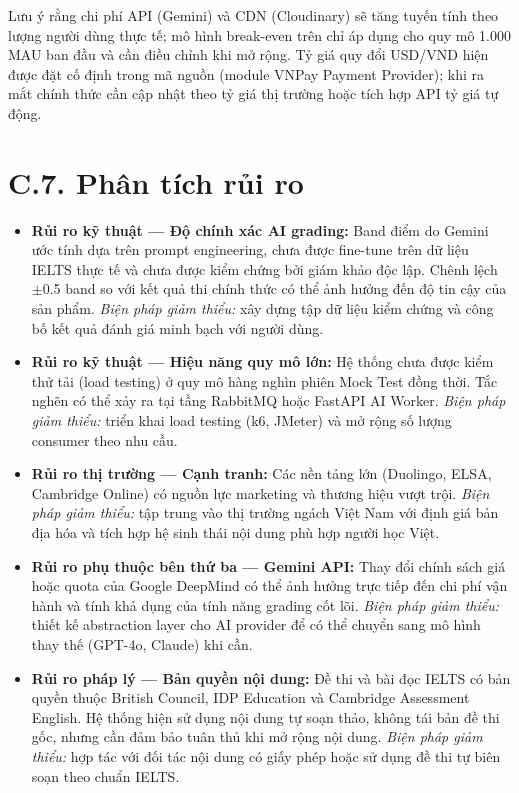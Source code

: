 Lưu ý rằng chi phí API (Gemini) và CDN (Cloudinary) sẽ tăng tuyến tính theo lượng người dùng thực tế; mô hình break-even trên chỉ áp dụng cho quy mô 1.000 MAU ban đầu và cần điều chỉnh khi mở rộng. Tỷ giá quy đổi USD/VND hiện được đặt cố định trong mã nguồn (module VNPay Payment Provider); khi ra mắt chính thức cần cập nhật theo tỷ giá thị trường hoặc tích hợp API tỷ giá tự động.

\section*{C.7. Phân tích rủi ro}

\begin{itemize}
    \item \textbf{Rủi ro kỹ thuật --- Độ chính xác AI grading:} Band điểm do Gemini ước tính dựa trên prompt engineering, chưa được fine-tune trên dữ liệu IELTS thực tế và chưa được kiểm chứng bởi giám khảo độc lập. Chênh lệch $\pm$0.5 band so với kết quả thi chính thức có thể ảnh hưởng đến độ tin cậy của sản phẩm. \textit{Biện pháp giảm thiểu:} xây dựng tập dữ liệu kiểm chứng và công bố kết quả đánh giá minh bạch với người dùng.

    \item \textbf{Rủi ro kỹ thuật --- Hiệu năng quy mô lớn:} Hệ thống chưa được kiểm thử tải (load testing) ở quy mô hàng nghìn phiên Mock Test đồng thời. Tắc nghẽn có thể xảy ra tại tầng RabbitMQ hoặc FastAPI AI Worker. \textit{Biện pháp giảm thiểu:} triển khai load testing (k6, JMeter) và mở rộng số lượng consumer theo nhu cầu.

    \item \textbf{Rủi ro thị trường --- Cạnh tranh:} Các nền tảng lớn (Duolingo, ELSA, Cambridge Online) có nguồn lực marketing và thương hiệu vượt trội. \textit{Biện pháp giảm thiểu:} tập trung vào thị trường ngách Việt Nam với định giá bản địa hóa và tích hợp hệ sinh thái nội dung phù hợp người học Việt.

    \item \textbf{Rủi ro phụ thuộc bên thứ ba --- Gemini API:} Thay đổi chính sách giá hoặc quota của Google DeepMind có thể ảnh hưởng trực tiếp đến chi phí vận hành và tính khả dụng của tính năng grading cốt lõi. \textit{Biện pháp giảm thiểu:} thiết kế abstraction layer cho AI provider để có thể chuyển sang mô hình thay thế (GPT-4o, Claude) khi cần.

    \item \textbf{Rủi ro pháp lý --- Bản quyền nội dung:} Đề thi và bài đọc IELTS có bản quyền thuộc British Council, IDP Education và Cambridge Assessment English. Hệ thống hiện sử dụng nội dung tự soạn thảo, không tái bản đề thi gốc, nhưng cần đảm bảo tuân thủ khi mở rộng nội dung. \textit{Biện pháp giảm thiểu:} hợp tác với đối tác nội dung có giấy phép hoặc sử dụng đề thi tự biên soạn theo chuẩn IELTS.
\end{itemize}

